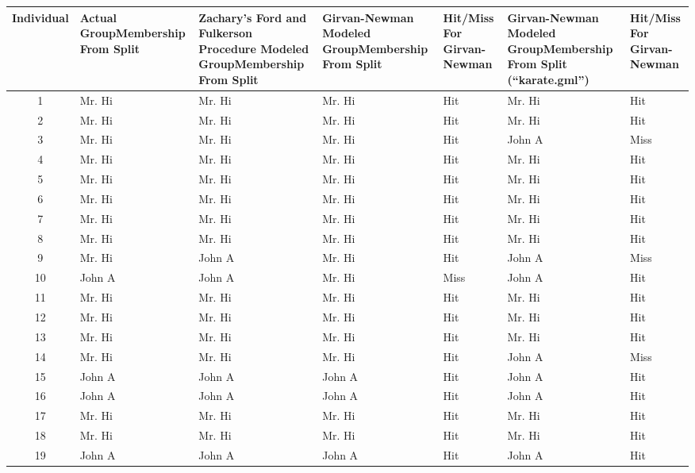 \begin{table}
\small
\begin{tabular}{ | c | p{2cm} | p{2cm} | p{2cm} | p{2cm} | p{2cm} | p{2cm} |}
\hline
Individual & Actual Group\newline Membership From Split & Zachary's Ford and Fulkerson Procedure Modeled Group\newline Membership From Split & Girvan-Newman Modeled Group\newline Membership From Split & Hit/Miss For Girvan-Newman& Girvan-Newman Modeled Group\newline Membership From Split
\newline (``karate.gml'')& Hit/Miss For Girvan-Newman\\
\hline
1 & Mr. Hi & Mr. Hi & Mr. Hi & Hit & Mr. Hi & Hit\\
\hline
2 & Mr. Hi & Mr. Hi & Mr. Hi & Hit & Mr. Hi & Hit\\
\hline
3 & Mr. Hi & Mr. Hi & Mr. Hi & Hit & John A & Miss\\
\hline
4 & Mr. Hi & Mr. Hi & Mr. Hi & Hit & Mr. Hi & Hit\\
\hline
5 & Mr. Hi & Mr. Hi & Mr. Hi & Hit & Mr. Hi & Hit\\
\hline
6 & Mr. Hi & Mr. Hi & Mr. Hi & Hit & Mr. Hi & Hit\\
\hline
7 & Mr. Hi & Mr. Hi & Mr. Hi & Hit & Mr. Hi & Hit\\
\hline
8 & Mr. Hi & Mr. Hi & Mr. Hi & Hit & Mr. Hi & Hit\\
\hline
9 & Mr. Hi & John A & Mr. Hi & Hit & John A & Miss\\
\hline
10 & John A & John A & Mr. Hi & Miss & John A & Hit\\
\hline
11 & Mr. Hi & Mr. Hi & Mr. Hi & Hit & Mr. Hi & Hit\\
\hline
12 & Mr. Hi & Mr. Hi & Mr. Hi & Hit & Mr. Hi & Hit\\
\hline
13 & Mr. Hi & Mr. Hi & Mr. Hi & Hit & Mr. Hi & Hit\\
\hline
14 & Mr. Hi & Mr. Hi & Mr. Hi & Hit & John A & Miss\\
\hline
15 & John A & John A & John A & Hit & John A & Hit\\
\hline
16 & John A & John A & John A & Hit & John A & Hit\\
\hline
17 & Mr. Hi & Mr. Hi & Mr. Hi & Hit & Mr. Hi & Hit\\
\hline
18 & Mr. Hi & Mr. Hi & Mr. Hi & Hit & Mr. Hi & Hit\\
\hline
19 & John A & John A & John A & Hit & John A & Hit\\

\end{tabular}
\end{table}
